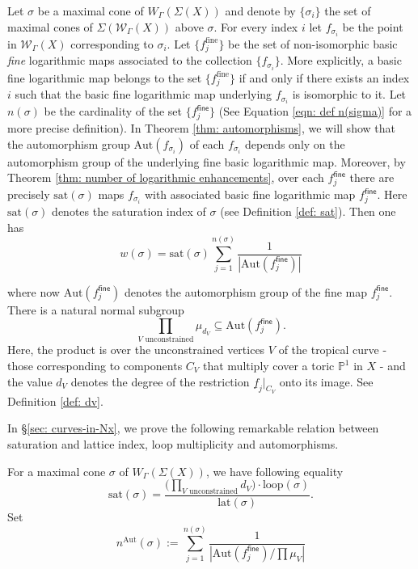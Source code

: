 \documentclass{article}
\def\cW{\mathcal{W}}
\newenvironment{customthm}[1]
{\renewcommand\theinnercustomthm{#1}\innercustomthm}
{\endinnercustomthm}
\newcommand{\fine}{\mathsf{fine}}
\newcommand{\nn}{n^{\operatorname{Aut}}}
\begin{document}
Let $\sigma$ be a maximal cone of $W_{\Gamma}(\Sigma(X))$ and denote by $\{ \sigma_i\}$ the set of maximal cones of $\Sigma(\cW_{\Gamma}(X))$ above $\sigma$. For every index $i$ let $f_{\sigma_i}$ be the point in $\cW_{\Gamma}(X)$ corresponding to $\sigma_i$. Let $\{f_j^\mathrm{fine}\}$ be the set of non-isomorphic basic \textit{fine} logarithmic maps associated to the collection $\{f_{\sigma_i}\}$. More explicitly, a basic fine logarithmic map belongs to the set $\{f_j^\mathrm{fine}\}$ if and only if there exists an index $i$ such that the basic fine logarithmic map underlying $f_{\sigma_i}$ is isomorphic to it. Let $n(\sigma)$ be the cardinality of the set $\{ f_j^\fine\}$ (See Equation \ref{eqn: def n(sigma)} for a more precise definition).  In Theorem \ref{thm: automorphisms}, we will show that the automorphism group
$\mathrm{Aut}(f_{\sigma_i})$ of each $f_{\sigma_i}$ 
depends only on the automorphism group of the underlying fine basic logarithmic map. Moreover, by Theorem \ref{thm: number of logarithmic enhancements}, over each $f_j^\fine$ there are precisely $\mathrm{sat}(\sigma)$ maps $f_{\sigma_i}$ with associated basic fine logarithmic map $f_j^\fine$. Here $\mathrm{sat}(\sigma)$ denotes the saturation index of $\sigma$ (see Definition \ref{def: sat}). Then one has
\begin{equation}\label{eqn: reduction_to_aut_of_fine_map}
w(\sigma)= \mathrm{sat}(\sigma) \sum_{j=1}^{n(\sigma)} \frac{1}{|\mathrm{Aut}(f_j^\fine)|}
\end{equation}

where now $\mathrm{Aut}(f_j^\fine)$ denotes the automorphism group of the fine map $f_j^\fine$. There is a natural normal subgroup 
\[
 \prod_{V \text{ unconstrained}} \mu_{d_V} \subseteq \mathrm{Aut}(f_j^{\mathsf{fine}}).
\]
Here, the product is over the unconstrained vertices $V$ of the tropical curve - those corresponding to components $C_V$ that multiply cover a toric $\mathbb{P}^1$ in $X$ - and the value $d_V$ denotes the degree of the restriction $\underline{f}_j|_{C_V}$ onto its image. See Definition \ref{def: dv}. 

In \S\ref{sec: curves-in-Nx}, we prove the following remarkable relation between saturation and lattice index, loop multiplicity and automorphisms.

\begin{customthm}{C}\label{thm: relation indices, loop aut}
    For a maximal cone $\sigma$ of $W_{\Gamma}(\Sigma(X))$, we have following equality 
    \[
\mathrm{sat}(\sigma)= 
\frac{ \bigg(
\prod\limits_{V \text{ unconstrained}} d_V \bigg) \cdot \mathrm{loop}(\sigma)
}{\mathrm{lat}(\sigma)}.
\]
\end{customthm}
Set
\begin{equation*}
\nn(\sigma) :=  \sum_{j=1}^{n(\sigma)} \frac{1}{|\mathrm{Aut}(f_j^\fine)/ \prod \mu_V|} 
\end{equation*}
\end{document}
